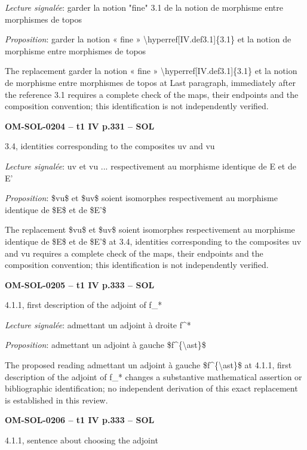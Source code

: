 \emph{Lecture signalée}: garder la notion "fine" 3.1 de la notion de morphisme entre morphismes de topos\par
\emph{Proposition}: garder la notion « fine » \textbackslash{}hyperref[IV.def3.1]\{3.1\} et la notion de morphisme entre morphismes de topos\par
The replacement garder la notion « fine » \textbackslash{}hyperref[IV.def3.1]\{3.1\} et la notion de morphisme entre morphismes de topos at Last paragraph, immediately after the reference 3.1 requires a complete check of the maps, their endpoints and the composition convention; this identification is not independently verified.\par
\par\noindent\textbf{OM-SOL-0204 -- t1 IV p.331 -- SOL}\par
3.4, identities corresponding to the composites uv and vu\par
\emph{Lecture signalée}: uv et vu ... respectivement au morphisme identique de E et de E'\par
\emph{Proposition}: \$vu\$ et \$uv\$ soient isomorphes respectivement au morphisme identique de \$E\$ et de \$E'\$\par
The replacement \$vu\$ et \$uv\$ soient isomorphes respectivement au morphisme identique de \$E\$ et de \$E'\$ at 3.4, identities corresponding to the composites uv and vu requires a complete check of the maps, their endpoints and the composition convention; this identification is not independently verified.\par
\par\noindent\textbf{OM-SOL-0205 -- t1 IV p.333 -- SOL}\par
4.1.1, first description of the adjoint of f\_*\par
\emph{Lecture signalée}: admettant un adjoint à droite f\textasciicircum{}*\par
\emph{Proposition}: admettant un adjoint à gauche \$f\textasciicircum{}\{\textbackslash{}ast\}\$\par
The proposed reading admettant un adjoint à gauche \$f\textasciicircum{}\{\textbackslash{}ast\}\$ at 4.1.1, first description of the adjoint of f\_* changes a substantive mathematical assertion or bibliographic identification; no independent derivation of this exact replacement is established in this review.\par
\par\noindent\textbf{OM-SOL-0206 -- t1 IV p.333 -- SOL}\par
4.1.1, sentence about choosing the adjoint\par
